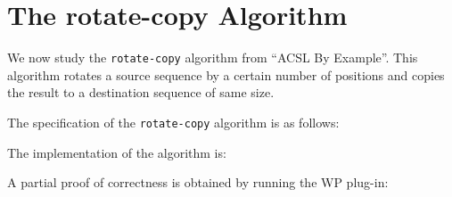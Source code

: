 \section{The \textsf{rotate-copy} Algorithm}
\label{rotate-copy}

We now study the \texttt{rotate-copy} algorithm from ``ACSL By Example''.
This algorithm rotates a source sequence by a certain number of positions and
copies the result to a destination sequence of same size.

The specification of the \texttt{rotate-copy} algorithm is as follows:


The implementation of the algorithm is:


A partial proof of correctness is obtained by running the \textsf{WP} plug-in: 

